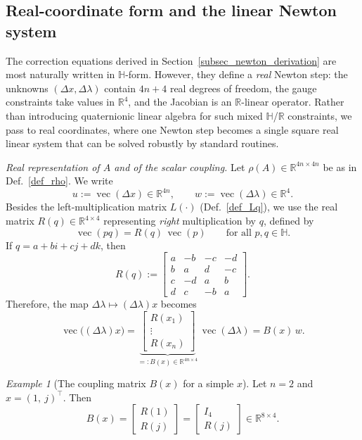 \documentclass[preprint,12pt]{elsarticle}  %
\theoremstyle{definition}
\theoremstyle{definition}
\theoremstyle{definition}
\theoremstyle{definition}
\theoremstyle{definition}
\theoremstyle{remark}
\theoremstyle{remark}
\newtheorem{Ex}{Example}
\theoremstyle{remark}
\DeclareRobustCommand{\i}{\ensuremath{\mathbf{i}}}
\DeclareRobustCommand{\j}{\ensuremath{\mathbf{j}}}
\DeclareRobustCommand{\k}{\ensuremath{\mathbf{k}}}
\def\i{i}\def\j{j}\def\k{k}%
\newcommand{\RR}{\mathbb{R}}
\newcommand{\HH}{\mathbb{H}}
\DeclareMathOperator{\rvec}{vec}
\begin{document}
\subsection{Real-coordinate form and the linear Newton system}
\label{subsec_newton_real_form}
The correction equations derived in Section~\ref{subsec_newton_derivation} are most naturally written in $\HH$-form.
However, they define a \emph{real} Newton step: the unknowns $(\Delta x,\Delta\lambda)$ contain $4n+4$ real degrees of
freedom, the gauge constraints take values in $\RR^4$, and the Jacobian is an $\RR$-linear operator.
Rather than introducing quaternionic linear algebra for such mixed $\HH$/$\RR$ constraints, we pass to real coordinates,
where one Newton step becomes a single square real linear system that can be solved robustly by standard routines.

\noindent\emph{Real representation of $A$ and of the scalar coupling.}
Let $\rho(A)\in\RR^{4n\times4n}$ be as in Def.~\ref{def_rho}. We write
\[
u:=\rvec(\Delta x)\in\RR^{4n},\qquad w:=\rvec(\Delta\lambda)\in\RR^{4}.
\]
Besides the left-multiplication matrix $L(\cdot)$ (Def.~\ref{def_Lq}), we use the real matrix $R(q)\in\RR^{4\times4}$
representing \emph{right} multiplication by $q$, defined by
\[
\rvec(pq)=R(q)\,\rvec(p)\qquad\text{for all }p,q\in\HH.
\]
If $q=a+b\i+c\j+d\k$, then
\[
R(q):=
\begin{bmatrix}
 a & -b & -c & -d\\
 b &  a &  d & -c\\
 c & -d &  a &  b\\
 d &  c & -b &  a
\end{bmatrix}.
\]
Therefore, the map $\Delta\lambda\mapsto(\Delta\lambda)x$ becomes
\begin{equation}
\label{eq_Bx_def}
\rvec\bigl((\Delta\lambda)x\bigr)=
\underbrace{\begin{bmatrix}
R(x_1)\\ \vdots\\ R(x_n)
\end{bmatrix}}_{=:B(x)\in\RR^{4n\times4}}\,
\rvec(\Delta\lambda)
=B(x)\,w .
\end{equation}

\begin{Ex}[The coupling matrix $B(x)$ for a simple $x$]
\label{ex_Bx_simple}
Let $n=2$ and $x=(1,\ \j)^\top$. Then
\[
B(x)=\begin{bmatrix} R(1)\\ R(\j)\end{bmatrix}
=\begin{bmatrix} I_4\\ R(\j)\end{bmatrix}\in\RR^{8\times 4}.
\]
\end{Ex}
\end{document}
